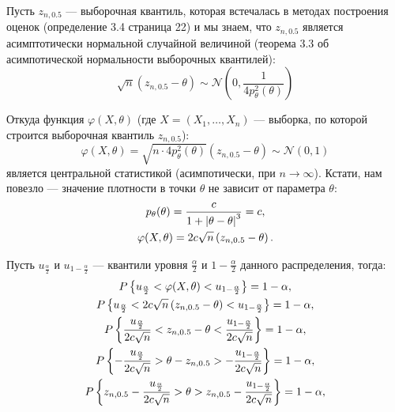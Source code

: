 Пусть $z_{n,0.5}$ --- выборочная квантиль, которая встечалась в методах построения оценок (определение 3.4 страница 22) и мы знаем,
что $z_{n,0.5}$ является асимптотически нормальной случайной величиной (теорема 3.3 об асимпотической нормальности выборочных квантилей):
\begin{equation}
    \sqrt{n} \left ( z_{n,0.5} - \theta \right ) \sim \mathcal{N} \left ( 0, \frac{1}{4 p_\theta^2(\theta)} \right )
\end{equation}

Откуда функция $\varphi(X, \theta)$ (где $X = \left ( X_1, \dots, X_n \right )$ --- выборка, по которой строится выборочная квантиль $z_{n,0.5}$):
\begin{equation}
    \varphi(X, \theta) = \sqrt{n \cdot 4 p_\theta^2(\theta)} \left ( z_{n,0.5} - \theta \right ) \sim \mathcal{N} \left ( 0, 1 \right )
\end{equation}
является центральной статистикой (асимпотически, при $n \rightarrow \infty$).
Кстати, нам повезло --- значение плотности в точки $\theta$ не зависит от параметра $\theta$:
\begin{gather}
    p_\theta(\theta) = \frac{c}{1 + \left | \theta - \theta \right |^3} = c , \\
    \varphi(X, \theta) = 2 c \sqrt{n} \left ( z_{n,0.5} - \theta \right ) .
\end{gather}

Пусть $u_{\frac{\alpha}{2}}$ и $u_{1 - \frac{\alpha}{2}}$ --- квантили уровня $\frac{\alpha}{2}$ и $1 - \frac{\alpha}{2}$ данного распределения,
тогда:
\begin{gather}
    P \left \{ u_{\frac{\alpha}{2}} < \varphi(X, \theta) < u_{1 - \frac{\alpha}{2}} \right \} = 1 - \alpha , \\
    P \left \{ u_{\frac{\alpha}{2}} < 2 c \sqrt{n} \left ( z_{n,0.5} - \theta \right ) < u_{1 - \frac{\alpha}{2}} \right \} = 1 - \alpha , \\
    P \left \{  \frac{u_{\frac{\alpha}{2}}}{2 c \sqrt{n}} < z_{n,0.5} - \theta < \frac{u_{1 - \frac{\alpha}{2}}}{2 c \sqrt{n}} \right \} = 1 - \alpha , \\
    P \left \{  - \frac{u_{\frac{\alpha}{2}}}{2 c \sqrt{n}} > \theta - z_{n,0.5} > - \frac{u_{1 - \frac{\alpha}{2}}}{2 c \sqrt{n}} \right \} = 1 - \alpha , \\
    P \left \{  z_{n,0.5} - \frac{u_{\frac{\alpha}{2}}}{2 c \sqrt{n}} > \theta > z_{n,0.5} - \frac{u_{1 - \frac{\alpha}{2}}}{2 c \sqrt{n}} \right \} = 1 - \alpha , \\
\end{gather}

